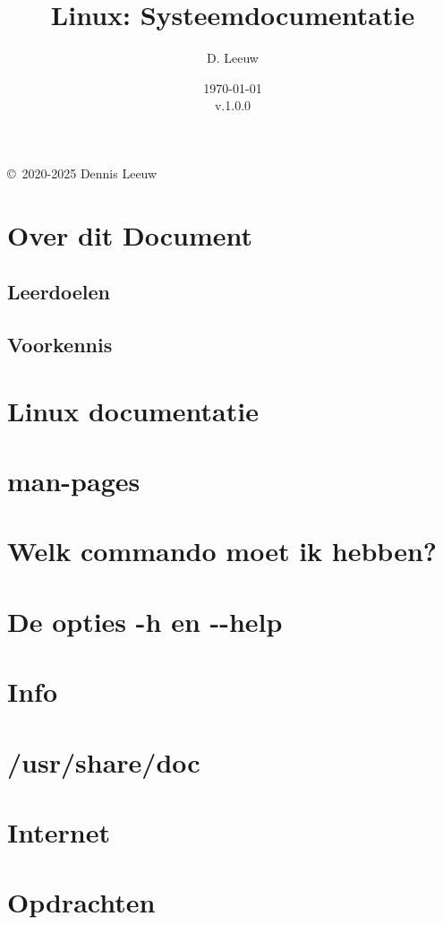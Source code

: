 \documentclass[a4paper,12pt,twoside,openright,titlepage]{book}
\author{D. Leeuw}
\title{Linux: Systeemdocumentatie}
\date{\today\\v.1.0.0}
\begin{document}

\maketitle

\copyright\ 2020-2025 Dennis Leeuw\\




\frontmatter
\chapter{Over dit Document}
\section{Leerdoelen}

\section{Voorkennis}


\tableofcontents

\mainmatter
\chapter{Linux documentatie}

\chapter{man-pages}

\chapter{Welk commando moet ik hebben?}

\chapter{De opties -h en -{}-help}

\chapter{Info}

\chapter{/usr/share/doc}

\chapter{Internet}

\chapter{Opdrachten}


\backmatter
\printindex
\end{document}
